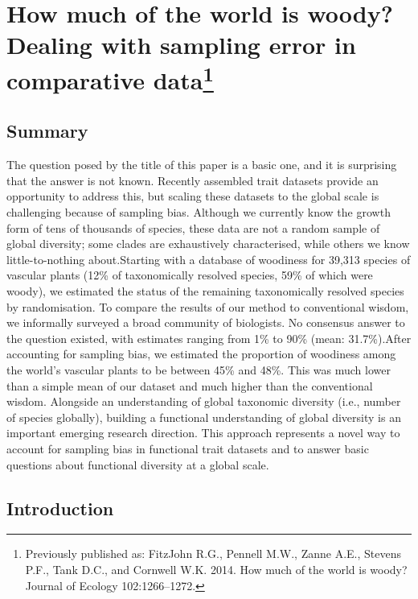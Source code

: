 \chapter[How much of the world is woody? Dealing with sampling error in comparative data]{How much of the world is woody? Dealing with sampling error in comparative data\footnote {Previously published as: FitzJohn R.G., Pennell M.W., Zanne A.E., Stevens P.F., Tank D.C., and Cornwell W.K. 2014. How much of the world is woody? 
  Journal of Ecology 102:1266--1272.}}
\label{chap:wood}

\section{Summary}
The question posed by the title of this paper is a basic one,
  and it is surprising that the answer is not known. Recently
  assembled trait datasets provide an opportunity to address this, but
  scaling these datasets to the global scale is challenging because of
  sampling bias.  Although we currently know the growth form of tens
  of thousands of species, these data are not a random sample of
  global diversity; some clades are exhaustively characterised, while
  others we know little-to-nothing about.Starting with a database of woodiness for 39,313 species of
  vascular plants (12\% of taxonomically resolved species, 59\% of
  which were woody), we estimated the status of the remaining
  taxonomically resolved species by randomisation.  To compare the
  results of our method to conventional wisdom, we informally surveyed
  a broad community of biologists.  No consensus answer to the
  question existed, with estimates ranging from 1\% to 90\% (mean:
  31.7\%).After accounting for sampling bias, we estimated the proportion
  of woodiness among the world's vascular plants to be between 45\%
  and 48\%.  This was much lower than a simple mean of our dataset and
  much higher than the conventional wisdom. Alongside an understanding of global taxonomic
  diversity (i.e., number of species globally), building a functional
  understanding of global diversity is an important emerging research
  direction.  This approach represents a novel way to account for
  sampling bias in functional trait datasets and to answer basic
  questions about functional diversity at a global scale.

\section{Introduction}

